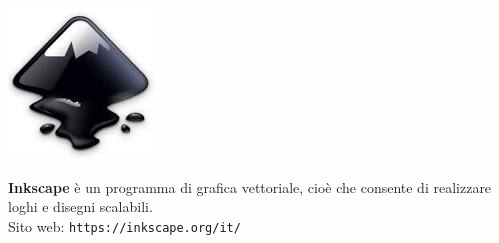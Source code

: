 \documentclass[a4paper, 12pt]{extarticle}
\begin{document}
\begin{minipage}{.2\linewidth}
    \includegraphics[width=.9\linewidth]{img/opuscolo-11.png}
\end{minipage}
\begin{minipage}{.75\linewidth}
\textbf{Inkscape} è un programma di grafica vettoriale, cioè che
consente di realizzare loghi e disegni scalabili.\\
Sito web: \texttt{https://inkscape.org/it/}
\end{minipage}
\end{document}
